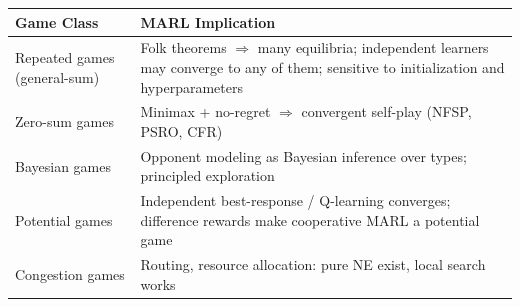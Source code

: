 \documentclass[11pt,a4paper]{article}
\theoremstyle{definition}
\theoremstyle{plain}
\theoremstyle{remark}
\begin{document}
\medskip

\begin{center}
\renewcommand{\arraystretch}{1.4}
\begin{tabular}{@{}p{3.5cm}p{8.5cm}@{}}
\toprule
\textbf{Game Class} & \textbf{MARL Implication} \\
\midrule

Repeated games (general-sum) &
Folk theorems $\Rightarrow$ many equilibria; independent learners may converge to any of them; sensitive to initialization and hyperparameters \\

Zero-sum games &
Minimax + no-regret $\Rightarrow$ convergent self-play (NFSP, PSRO, CFR) \\

Bayesian games &
Opponent modeling as Bayesian inference over types; principled exploration \\

Potential games &
Independent best-response / Q-learning converges; difference rewards make cooperative MARL a potential game \\

Congestion games &
Routing, resource allocation: pure NE exist, local search works \\

\bottomrule
\end{tabular}
\end{center}
\end{document}
